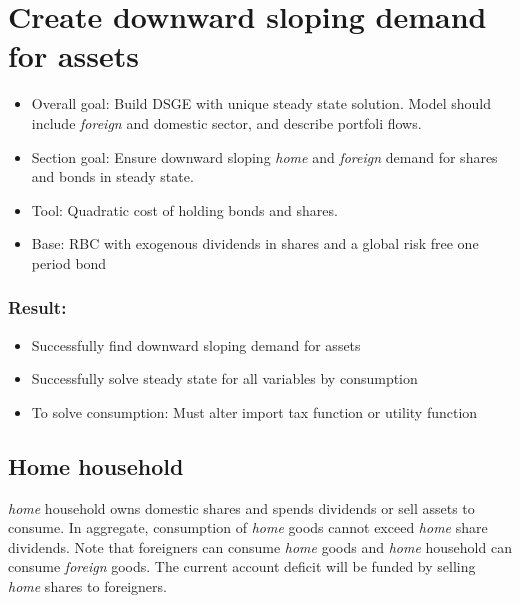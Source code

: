\documentclass[a4paper]{article}
\begin{document}
\newpage






\section{Create downward sloping demand for assets}\label{HoldingCost}
\begin{itemize}
\item Overall goal: Build DSGE with unique steady state solution. Model should include \emph{foreign} and domestic sector, and describe portfoli flows. 
\item Section goal: Ensure downward sloping \emph{home} and \emph{foreign} demand for shares and bonds in steady state. 
\item Tool: Quadratic cost of holding bonds and shares. 
\item Base: RBC with exogenous dividends in shares and a global risk free one period bond
\end{itemize}

\subsubsection{Result:}
\begin{itemize}
\item Successfully find downward sloping demand for assets
\item Successfully solve steady state for all variables by consumption
\item To solve consumption: Must alter import tax function or utility function
\end{itemize}

\subsection{Home household}
\emph{home} household owns domestic shares and spends dividends or sell assets to consume. In aggregate, consumption of \emph{home} goods cannot exceed \emph{home} share dividends. Note that foreigners can consume \emph{home} goods and \emph{home} household can consume \emph{foreign} goods. The current account deficit will be funded by selling \emph{home} shares to foreigners. 
\end{document}
